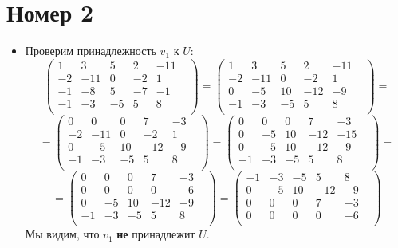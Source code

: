 \documentclass[a4paper,12pt]{article}
\begin{document}
\section*{Номер 2}
\begin{itemize}
\item
Проверим принадлежность $v_1$ к $U$:
\[
\begin{pmatrix}
1 & 3 & 5 & 2 & -11 & \\
-2 & -11 & 0 & -2 & 1 & \\
-1 & -8 & 5 & -7 & -1 & \\
-1 & -3 & -5 & 5 & 8 & \\
\end{pmatrix}
=
\begin{pmatrix}
1 & 3 & 5 & 2 & -11 & \\
-2 & -11 & 0 & -2 & 1 & \\
0 & -5 & 10 & -12 & -9 & \\
-1 & -3 & -5 & 5 & 8 & \\
\end{pmatrix}
=
\]
\[
=
\begin{pmatrix}
0 & 0 & 0 & 7 & -3 & \\
-2 & -11 & 0 & -2 & 1 & \\
0 & -5 & 10 & -12 & -9 & \\
-1 & -3 & -5 & 5 & 8 & \\
\end{pmatrix}
=
\begin{pmatrix}
0 & 0 & 0 & 7 & -3 & \\
0 & -5 & 10 & -12 & -15 & \\
0 & -5 & 10 & -12 & -9 & \\
-1 & -3 & -5 & 5 & 8 & \\
\end{pmatrix}
=
\]
\[
=
\begin{pmatrix}
0 & 0 & 0 & 7 & -3 & \\
0 & 0 & 0 & 0 & -6 & \\
0 & -5 & 10 & -12 & -9 & \\
-1 & -3 & -5 & 5 & 8 & \\
\end{pmatrix}
=
\begin{pmatrix}
-1 & -3 & -5 & 5 & 8 & \\
0 & -5 & 10 & -12 & -9 & \\
0 & 0 & 0 & 7 & -3 & \\
0 & 0 & 0 & 0 & -6 & \\
\end{pmatrix}
\]
Мы видим, что  $v_1$ \textbf{не} принадлежит $U$.

\end{itemize}
\end{document}
